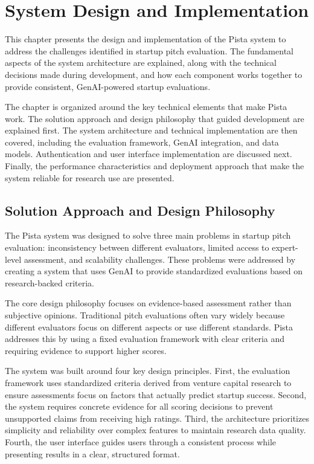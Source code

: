 \chapter{System Design and Implementation} \label{ch:problem-solution}

This chapter presents the design and implementation of the Pista system to address the challenges identified in startup pitch evaluation. The fundamental aspects of the system architecture are explained, along with the technical decisions made during development, and how each component works together to provide consistent, GenAI-powered startup evaluations.

The chapter is organized around the key technical elements that make Pista work. The solution approach and design philosophy that guided development are explained first. The system architecture and technical implementation are then covered, including the evaluation framework, GenAI integration, and data models. Authentication and user interface implementation are discussed next. Finally, the performance characteristics and deployment approach that make the system reliable for research use are presented.

\section{Solution Approach and Design Philosophy} \label{sec:solution-approach}

The Pista system was designed to solve three main problems in startup pitch evaluation: inconsistency between different evaluators, limited access to expert-level assessment, and scalability challenges. These problems were addressed by creating a system that uses GenAI to provide standardized evaluations based on research-backed criteria.

The core design philosophy focuses on evidence-based assessment rather than subjective opinions. Traditional pitch evaluations often vary widely because different evaluators focus on different aspects or use different standards. Pista addresses this by using a fixed evaluation framework with clear criteria and requiring evidence to support higher scores.

The system was built around four key design principles. First, the evaluation framework uses standardized criteria derived from venture capital research to ensure assessments focus on factors that actually predict startup success. Second, the system requires concrete evidence for all scoring decisions to prevent unsupported claims from receiving high ratings. Third, the architecture prioritizes simplicity and reliability over complex features to maintain research data quality. Fourth, the user interface guides users through a consistent process while presenting results in a clear, structured format.

